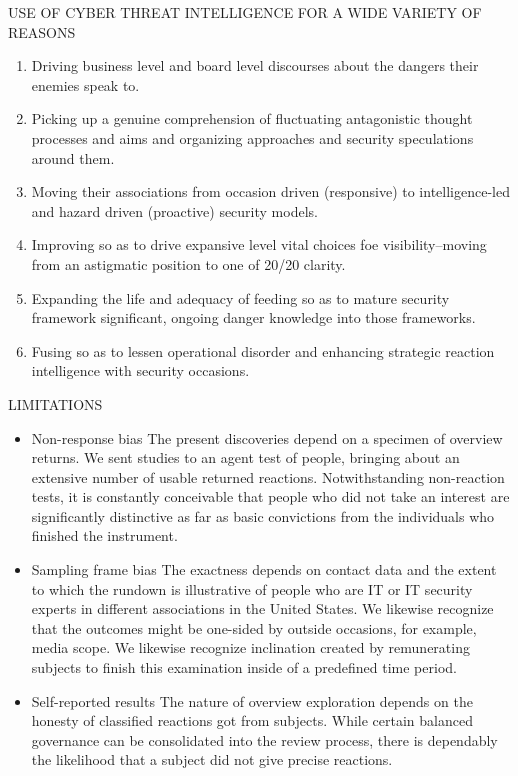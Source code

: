 \documentclass{article}
\begin{document}
USE OF CYBER THREAT INTELLIGENCE FOR A WIDE VARIETY OF REASONS


\begin{enumerate}
\item Driving business level and board level discourses about the dangers their enemies speak to.
\item Picking up a genuine comprehension of fluctuating antagonistic thought processes and aims and organizing approaches and security speculations around them.
\item Moving their associations from occasion driven (responsive) to intelligence-led and hazard driven (proactive) security models.
\item Improving so as to drive expansive level vital choices foe visibility–moving from an astigmatic position to one of 20/20 clarity.
\item Expanding the life and adequacy of feeding so as to mature security framework significant, ongoing danger knowledge into those frameworks.
\item Fusing so as to lessen operational disorder and enhancing strategic reaction intelligence with security occasions.
\end{enumerate}

LIMITATIONS
\begin{itemize}
\item Non-response bias
The present discoveries depend on a specimen of overview returns. We sent studies to an agent test of people, bringing about an extensive number of usable returned reactions. Notwithstanding non-reaction tests, it is constantly conceivable that people who did not take an interest are significantly distinctive as far as basic convictions from the individuals who finished the instrument.
\item Sampling frame bias
The exactness depends on contact data and the extent to which the rundown is illustrative of people who are IT or IT security experts in different associations in the United States. We likewise recognize that the outcomes might be one-sided by outside occasions, for example, media scope. We likewise recognize inclination created by remunerating subjects to finish this examination inside of a predefined time period.
\item Self-reported results
The nature of overview exploration depends on the honesty of classified reactions got from subjects. While certain balanced governance can be consolidated into the review process, there is dependably the likelihood that a subject did not give precise reactions.
\end{itemize}
\end{document}
